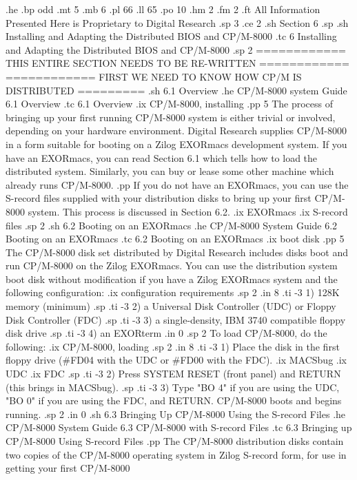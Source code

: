 .he
.bp odd
.mt 5
.mb 6
.pl 66
.ll 65
.po 10
.hm 2
.fm 2
.ft  All Information Presented Here is Proprietary to Digital Research
.sp 3
.ce 2
.sh
Section 6
.sp
.sh
Installing and Adapting the Distributed BIOS and CP/M-8000
.tc 6  Installing and Adapting the Distributed BIOS and CP/M-8000
.sp 2
============ THIS ENTIRE SECTION NEEDS TO BE RE-WRITTEN ============
============ FIRST WE NEED TO KNOW HOW CP/M IS DISTRIBUTED =========
.sh
6.1  Overview
.he CP/M-8000 system Guide                               6.1  Overview
.tc    6.1  Overview
.ix CP/M-8000, installing
.pp 5
The process of bringing up your first running CP/M-8000 system is
either trivial or involved, depending on your hardware environment.
Digital Research supplies CP/M-8000 in a form suitable for booting
on a Zilog EXORmacs development system.  If you have an EXORmacs,
you can read Section 6.1 which tells how to load the distributed system.
Similarly, you can buy or lease some other machine which already runs
CP/M-8000.
.pp
If you do not have an EXORmacs, you can use the S-record files supplied
with your distribution disks to bring up your first CP/M-8000 system.  
This process is discussed in Section 6.2.  
.ix EXORmacs
.ix S-record files
.sp 2
.sh
6.2  Booting on an EXORmacs
.he CP/M-8000 System Guide                 6.2  Booting on an EXORmacs
.tc    6.2  Booting on an EXORmacs
.ix boot disk
.pp 5
The CP/M-8000 disk set distributed by Digital Research includes disks
boot and run CP/M-8000 on the Zilog EXORmacs.  You can use the distribution 
system boot disk without modification if you have a Zilog EXORmacs system 
and the following configuration:
.ix configuration requirements
.sp 2
.in 8
.ti -3
1) 128K memory (minimum)
.sp
.ti -3
2) a Universal Disk Controller (UDC) or Floppy Disk Controller (FDC)
.sp
.ti -3
3) a single-density, IBM 3740 compatible floppy disk drive 
.sp
.ti -3
4) an EXORterm
.in 0
.sp 2
To load CP/M-8000, do the following:
.ix CP/M-8000, loading
.sp 2
.in 8
.ti -3
1) Place the disk in the first floppy drive (#FD04 with the UDC or #FD00
with the FDC).
.ix MACSbug
.ix UDC
.ix FDC
.sp
.ti -3
2) Press SYSTEM RESET (front panel) and RETURN (this brings in MACSbug).
.sp
.ti -3
3) Type "BO 4" if you are using the UDC, "BO 0" if you are using the
FDC, and RETURN.  CP/M-8000 boots and begins running.
.sp 2
.in 0
.sh
6.3  Bringing Up CP/M-8000 Using the S-record Files
.he CP/M-8000 System Guide           6.3  CP/M-8000 with S-record Files
.tc    6.3  Bringing up CP/M-8000 Using S-record Files
.pp
The CP/M-8000 distribution disks contain two copies of the CP/M-8000 operating
system in Zilog S-record form, for use in getting your first CP/M-8000
